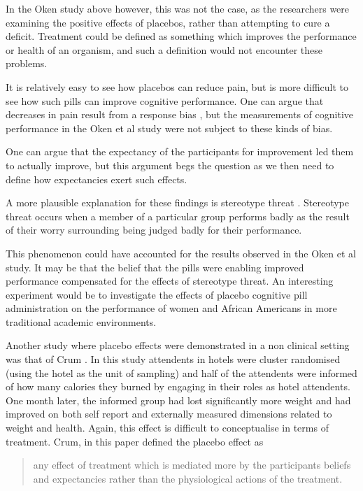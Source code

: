 In the Oken study above however, this was not the case, as the researchers were examining the positive effects of placebos, rather than attempting to cure a deficit. Treatment could be defined as something which improves the performance or health of an organism, and such a definition would not encounter these problems.

It is relatively easy to see how placebos can reduce pain, but is more difficult to see how such pills can improve cognitive performance. One can argue that decreases in pain result from a response bias \cite{Allan2002}, but the measurements of cognitive performance in the Oken et al study were not subject to these kinds of bias. 

 One can argue that the expectancy of the participants for improvement led them to actually improve, but this argument begs the question as we then need to define how expectancies exert such effects. 

A more plausible explanation for these findings is stereotype threat \cite{schmader2003converging,spencerclaude1999stereotype}. Stereotype threat occurs when a member of a particular group performs badly as the result of their worry surrounding being judged badly for their performance. 

This phenomenon could have accounted for the results observed in the Oken et al study.  It may be that the belief that the pills were enabling improved performance compensated for the effects of stereotype threat. An interesting experiment would be to investigate the effects of placebo cognitive pill administration on the performance of women and African Americans in more traditional academic environments.  

Another study where placebo effects were demonstrated in a non clinical setting was that of Crum \cite{Crum2007}. In this study attendents in hotels were cluster randomised (using the hotel as the unit of sampling) and half of the attendents were informed of how many calories they burned by engaging in their roles as hotel attendents. One month later, the informed group had lost significantly more weight and had improved on both self report and externally measured dimensions related to weight and health. Again, this effect is difficult to conceptualise in terms of treatment.  Crum, in this paper defined the placebo effect as

\begin{quotation}
  any effect of treatment which is mediated more by the participants
  beliefs and expectancies rather than the physiological actions of
  the treatment.
\end{quotation}

